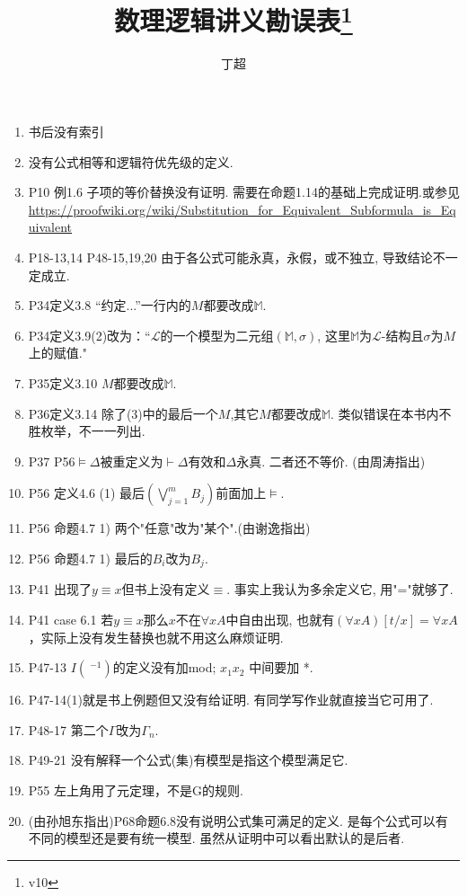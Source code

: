 \documentclass{article}
\begin{document}
\title{数理逻辑讲义勘误表\footnote{v10}}
\author{丁超}
\maketitle	
\begin{enumerate}
\item 书后没有索引
\item 没有公式相等和逻辑符优先级的定义. 
\item P10 例1.6 子项的等价替换没有证明. 需要在命题1.14的基础上完成证明.或参见\\ \url{https://proofwiki.org/wiki/Substitution_for_Equivalent_Subformula_is_Equivalent}
\item P18-13,14 P48-15,19,20 由于各公式可能永真，永假，或不独立, 导致结论不一定成立. 
\item P34定义3.8 “约定...”一行内的$M$都要改成$\mathbb{M}$. 
\item P34定义3.9(2)改为：“$\mathscr{L}$的一个模型为二元组$(\mathbb{M},\sigma)$, 这里$\mathbb{M}$为$\mathscr{L}$-结构且$\sigma$为$M$上的赋值."
\item P35定义3.10 $M$都要改成$\mathbb{M}$. 
\item P36定义3.14 除了(3)中的最后一个$M$,其它$M$都要改成$\mathbb{M}$. 类似错误在本书内不胜枚举，不一一列出. 
\item P37 P56$\models \Delta$被重定义为$\vdash \Delta$有效和$\Delta$永真. 二者还不等价. (由周涛指出)
\item P56 定义4.6 (1) 最后\((\bigvee\limits_{j=1}^m B_j)\)前面加上\(\models\).
\item P56 命题4.7 1) 两个"任意"改为"某个".(由谢逸指出)
\item P56 命题4.7 1) 最后的\(B_i\)改为\(B_j\).
\item P41 出现了$y\equiv x$但书上没有定义$\equiv$. 事实上我认为多余定义它, 用"="就够了. 
\item P41 case 6.1 若$y\equiv x$那么$x$不在$\forall xA$中自由出现, 也就有$(\forall xA)[t/x] = \forall xA$，实际上没有发生替换也就不用这么麻烦证明. 
\item P47-13 $I(~^{-1})$的定义没有加mod; $x_1x_2$ 中间要加 *. 
\item P47-14(1)就是书上例题但又没有给证明. 有同学写作业就直接当它可用了. 
\item P48-17 第二个$\Gamma$改为$\Gamma_n$. 
\item P49-21 没有解释一个公式(集)有模型是指这个模型满足它. 
\item P55 左上角用了元定理，不是G的规则. 
\item (由孙旭东指出)P68命题6.8没有说明公式集可满足的定义. 是每个公式可以有不同的模型还是要有统一模型. 虽然从证明中可以看出默认的是后者. 

\end{enumerate}
\end{document}
